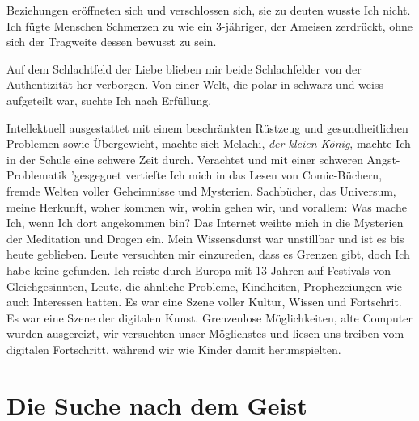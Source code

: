 \documentclass[12pt,a5paper,draft]{book}
\begin{document}
	Beziehungen eröffneten sich und verschlossen sich, sie zu deuten wusste Ich nicht. Ich fügte Menschen Schmerzen zu wie ein 3-jähriger, der Ameisen zerdrückt, ohne sich der Tragweite dessen bewusst zu sein.
	
	Auf dem Schlachtfeld der Liebe blieben mir beide Schlachfelder von der Authentizität her verborgen. Von einer Welt, die polar in schwarz und weiss aufgeteilt war, suchte Ich nach Erfüllung.
	
	Intellektuell ausgestattet mit einem beschränkten Rüstzeug und gesundheitlichen Problemen sowie Übergewicht, machte sich Melachi, \textit{der kleien König}, machte Ich in der Schule eine schwere Zeit durch. Verachtet und mit einer schweren Angst-Problematik 'gesgegnet vertiefte Ich mich in das Lesen von Comic-Büchern, fremde Welten voller Geheimnisse und Mysterien. Sachbücher, das Universum, meine Herkunft, woher kommen wir, wohin gehen wir, und vorallem: Was mache Ich, wenn Ich dort angekommen bin?
	Das Internet weihte mich in die Mysterien der Meditation und Drogen ein. 
	Mein Wissensdurst war unstillbar und ist es bis heute geblieben. Leute versuchten mir einzureden, dass es Grenzen gibt, doch Ich habe keine gefunden. Ich reiste durch Europa mit 13 Jahren auf Festivals von Gleichgesinnten, Leute, die ähnliche Probleme, Kindheiten, Prophezeiungen wie auch Interessen hatten. Es war eine Szene voller Kultur, Wissen und Fortschrit. Es war eine Szene der digitalen Kunst. Grenzenlose Möglichkeiten, alte Computer wurden ausgereizt, wir versuchten unser Möglichstes und liesen uns treiben vom digitalen Fortschritt, während wir wie Kinder damit herumspielten.                                                                                  
\section{Die Suche nach dem Geist}
\end{document}
